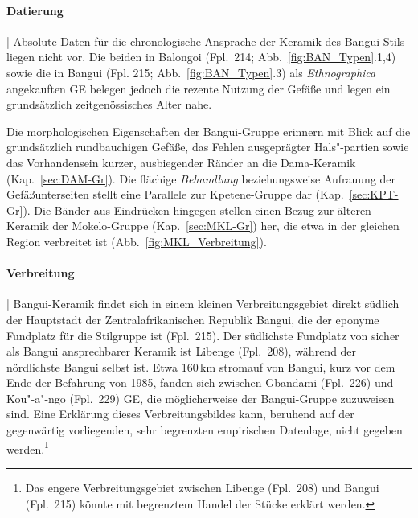 \paragraph{Datierung}\hspace{-.5em}|\hspace{.5em}%
Absolute Daten für die chronologische Ansprache der Keramik des Bangui-Stils liegen nicht vor. Die beiden in Balongoi (Fpl.~214; Abb.~\ref{fig:BAN_Typen}.1,4) sowie die in Bangui (Fpl. 215; Abb.~\ref{fig:BAN_Typen}.3) als \textit{Ethnographica} angekauften GE belegen jedoch die rezente Nutzung der Gefäße und legen ein grundsätzlich zeitgenössisches Alter nahe.

Die morphologischen Eigenschaften der Bangui-Gruppe erinnern mit Blick auf die grundsätzlich rundbauchigen Gefäße, das Fehlen ausgeprägter Hals"-partien sowie das Vorhandensein kurzer, ausbiegender Ränder an die Dama-Keramik (Kap.~\ref{sec:DAM-Gr}). Die flächige \textit{Behandlung} beziehungsweise Aufrauung der Gefäßunterseiten stellt eine Parallele zur Kpetene-Gruppe dar (Kap.~\ref{sec:KPT-Gr}). Die Bänder aus Eindrücken hingegen stellen einen Bezug zur älteren Keramik der Mokelo-Gruppe (Kap.~\ref{sec:MKL-Gr}) her, die etwa in der gleichen Region verbreitet ist (Abb.~\ref{fig:MKL_Verbreitung}).

\paragraph{Verbreitung}\hspace{-.5em}|\hspace{.5em}%
Bangui-Keramik findet sich in einem kleinen Verbreitungsgebiet direkt südlich der Hauptstadt der Zentralafrikanischen Republik Bangui, die der eponyme Fundplatz für die Stilgruppe ist (Fpl.~215). Der südlichste Fundplatz von sicher als Bangui ansprechbarer Keramik ist Libenge (Fpl.~208), während der nördlichste Bangui selbst ist. Etwa 160\,km stromauf von Bangui, kurz vor dem Ende der Befahrung von 1985, fanden sich zwischen Gbandami (Fpl.~226) und Kou"-a"-ngo (Fpl.~229) GE, die möglicherweise der Bangui-Gruppe zuzuweisen sind. Eine Erklärung dieses Verbreitungsbildes kann, beruhend auf der gegenwärtig vorliegenden, sehr begrenzten empirischen Datenlage, nicht gegeben werden.\footnote{Das engere Verbreitungsgebiet zwischen Libenge (Fpl.~208) und Bangui (Fpl.~215) könnte mit begrenztem Handel der Stücke erklärt werden.}